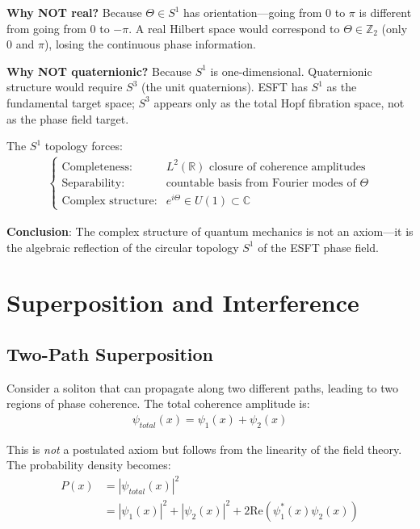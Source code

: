 ﻿\documentclass[twocolumn,showpacs,preprintnumbers,amsmath,amssymb,prd]{revtex4-2}
\begin{document}
\textbf{Why NOT real?} Because $\Theta \in S^1$ has orientation---going from 0 to $\pi$ is different from going from 0 to $-\pi$. A real Hilbert space would correspond to $\Theta \in \mathbb{Z}_2$ (only 0 and $\pi$), losing the continuous phase information.

\textbf{Why NOT quaternionic?} Because $S^1$ is one-dimensional. Quaternionic structure would require $S^3$ (the unit quaternions). ESFT has $S^1$ as the fundamental target space; $S^3$ appears only as the total Hopf fibration space, not as the phase field target.

The $S^1$ topology forces:
\begin{align}
\begin{cases}
\text{Completeness:} & L^2(\mathbb{R}) \text{ closure of coherence amplitudes} \\
\text{Separability:} & \text{countable basis from Fourier modes of } \Theta \\
\text{Complex structure:} & e^{i\Theta} \in U(1) \subset \mathbb{C}
\end{cases}
\end{align}

\textbf{Conclusion}: The complex structure of quantum mechanics is not an axiom---it is the algebraic reflection of the circular topology $S^1$ of the ESFT phase field.

\section{Superposition and Interference}

\subsection{Two-Path Superposition}

Consider a soliton that can propagate along two different paths, leading to two regions of phase coherence. The total coherence amplitude is:
\begin{align}
\psi_{total}(x) = \psi_1(x) + \psi_2(x)
\end{align}

This is \emph{not} a postulated axiom but follows from the linearity of the field theory. The probability density becomes:
\begin{align}
P(x) &= |\psi_{total}(x)|^2 \\
&= |\psi_1(x)|^2 + |\psi_2(x)|^2 + 2\text{Re}(\psi_1^*(x)\psi_2(x))
\end{align}
\end{document}
